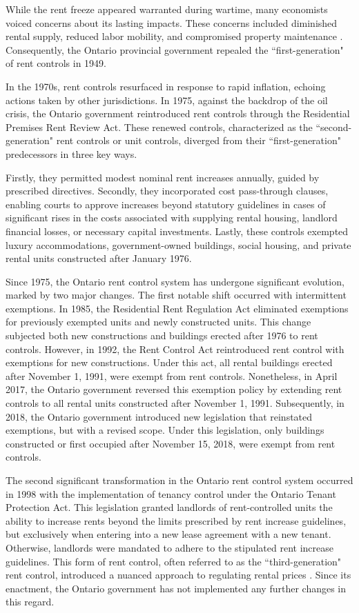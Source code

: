 \documentclass[parskip=full]{article}
\begin{document}
While the rent freeze appeared warranted during wartime, many economists voiced concerns about its lasting impacts. These concerns included diminished rental supply, reduced labor mobility, and compromised property maintenance \citep{arnott-1995}. Consequently, the Ontario provincial government repealed the ``first-generation" of rent controls in 1949.

In the 1970s, rent controls resurfaced in response to rapid inflation, echoing actions taken by other jurisdictions. In 1975, against the backdrop of the oil crisis, the Ontario government reintroduced rent controls through the Residential Premises Rent Review Act. These renewed controls, characterized as the ``second-generation" rent controls or unit controls, diverged from their ``first-generation" predecessors in three key ways.

Firstly, they permitted modest nominal rent increases annually, guided by prescribed directives. Secondly, they incorporated cost pass-through clauses, enabling courts to approve increases beyond statutory guidelines in cases of significant rises in the costs associated with supplying rental housing, landlord financial losses, or necessary capital investments. Lastly, these controls exempted luxury accommodations, government-owned buildings, social housing, and private rental units constructed after January 1976.

Since 1975, the Ontario rent control system has undergone significant evolution, marked by two major changes. The first notable shift occurred with intermittent exemptions. In 1985, the Residential Rent Regulation Act eliminated exemptions for previously exempted units and newly constructed units. This change subjected both new constructions and buildings erected after 1976 to rent controls. However, in 1992, the Rent Control Act reintroduced rent control with exemptions for new constructions. Under this act, all rental buildings erected after November 1, 1991, were exempt from rent controls. Nonetheless, in April 2017, the Ontario government reversed this exemption policy by extending rent controls to all rental units constructed after November 1, 1991. Subsequently, in 2018, the Ontario government introduced new legislation that reinstated exemptions, but with a revised scope. Under this legislation, only buildings constructed or first occupied after November 15, 2018, were exempt from rent controls.

The second significant transformation in the Ontario rent control system occurred in 1998 with the implementation of tenancy control under the Ontario Tenant Protection Act. This legislation granted landlords of rent-controlled units the ability to increase rents beyond the limits prescribed by rent increase guidelines, but exclusively when entering into a new lease agreement with a new tenant. Otherwise, landlords were mandated to adhere to the stipulated rent increase guidelines. This form of rent control, often referred to as the ``third-generation" rent control, introduced a nuanced approach to regulating rental prices \citep{arnott-2003}. Since its enactment, the Ontario government has not implemented any further changes in this regard.
\end{document}
